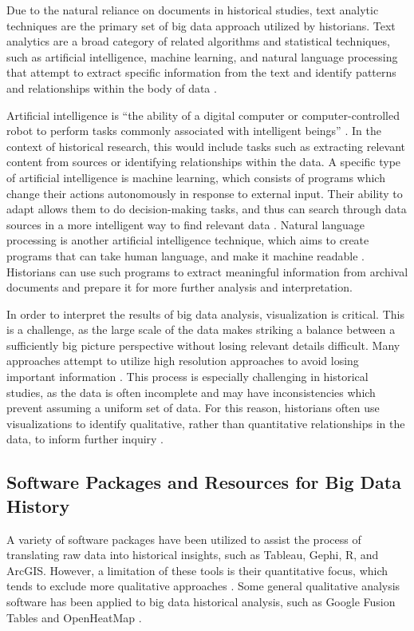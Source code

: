 \documentclass[sigconf]{acmart}
\begin{document}
Due to the natural reliance on documents in historical studies, text analytic techniques are the primary set of big data approach utilized by historians. Text analytics are a broad category of related algorithms and statistical techniques, such as artificial intelligence, machine learning, and natural language processing that attempt to extract specific information from the text and identify patterns and relationships within the body of data \cite{bdglobalhist}. 

Artificial intelligence is ``the ability of a digital computer or computer-controlled robot to perform tasks commonly associated with intelligent beings'' \cite{aidef}. In the context of historical research, this would include tasks such as extracting relevant content from sources or identifying relationships within the data. A specific type of artificial intelligence is machine learning, which consists of programs which change their actions autonomously in response to external input. Their ability to adapt allows them to do decision-making tasks, and thus can search through data sources in a more intelligent way to find relevant data \cite{bdsurvey}. Natural language processing is another artificial intelligence technique, which aims to create programs that can take human language, and make it machine readable \cite{natlangdef}. Historians can use such programs to extract meaningful information from archival documents and prepare it for more further analysis and interpretation.

In order to interpret the results of big data analysis, visualization is critical. This is a challenge, as the large scale of the data makes striking a balance between a sufficiently big picture perspective without losing relevant details difficult. Many approaches attempt to utilize high resolution approaches to avoid losing important information \cite{bdsurvey}. This process is especially challenging in historical studies, as the data is often incomplete and may have inconsistencies which prevent assuming a uniform set of data. For this reason, historians often use visualizations to identify qualitative, rather than quantitative relationships in the data, to inform further inquiry \cite{digitalrepublicletters}.

\subsection{Software Packages and Resources for Big Data History}

A variety of software packages have been utilized to assist the process of translating raw data into historical insights, such as Tableau, Gephi, R, and ArcGIS. However, a limitation of these tools is their quantitative focus, which tends to exclude more qualitative approaches \cite{digitalrepublicletters}. Some general qualitative analysis software has been applied to big data historical analysis, such as Google Fusion Tables and OpenHeatMap \cite{musichist}.
\end{document}
